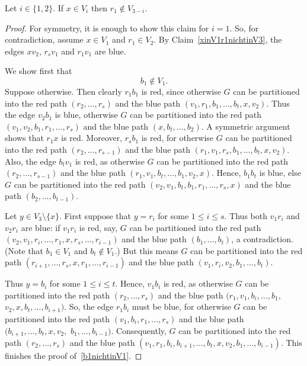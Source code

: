 \documentclass[a4paper,10pt]{article}
\begin{document}
\begin{claim}\label{xinV1r1inV2gehtnicht}
Let $i\in\{1,2\}$. If $x\in V_i$ then $r_1\notin V_{3-i}$.
\end{claim}

\begin{proof}
For symmetry, it is enough to show this claim for $i=1$. So, for contradiction, assume $x\in V_1$ and $r_1\in V_{2}$. 
By Claim~\ref{xinV1r1nichtinV3}, the edges $xv_{2}$, $r_sv_1$ and $r_1v_1$ are blue.

We show first that
\begin{equation}\label{b1nichtinV1}
 \text{$b_1 \notin V_1$.}
 \end{equation}
 Suppose otherwise.
Then clearly $r_1b_1$ is red, since otherwise $G$ can be partitioned into the red path $(r_2,\ldots,r_s)$ and the blue path $(v_1,r_1,b_1,\ldots,b_t,x,v_2)$.
Thus the edge $v_2b_1$ is blue, otherwise $G$ can be partitioned into the red path $(v_1,v_2,b_1,r_1,\ldots,r_s)$ and the blue path $(x,b_t,\ldots,b_2)$.
A symmetric argument shows that $r_1x$ is red.
Moreover, $r_sb_1$ is red, for otherwise $G$ can be partitioned into the red path $(r_2,\ldots,r_{s-1})$ and the blue path $(r_1,v_1,r_s,b_1,\ldots,b_t,x,v_2)$.
Also, the edge $b_tv_1$ is red, as otherwise $G$ can be partitioned into the red path $(r_2,\ldots,r_{s-1})$ and the blue path $(r_1,v_1,b_t,\ldots,b_1,v_2,x)$.
Hence, $b_1b_t$ is blue, else $G$ can be partitioned into the red path $(v_2,v_1,b_t,b_1,r_1,\ldots,r_s,x)$ and the blue path $(b_2,\ldots,b_{t-1})$.

Let $y \in V_3 \setminus \{x\}$.
First suppose that $y = r_i$ for some $1 \le i \le s$.
Thus both $v_1r_i$ and $v_2r_i$ are blue: if $v_1r_i$ is red, say, $G$ can be partitioned into the red path $(v_2,v_1,r_i,\ldots,r_1,x,r_s,\ldots,r_{i-1})$ and the blue path $(b_1,\ldots,b_t)$, a contradiction. (Note that $b_1\in V_1$ and $b_t\notin V_1$.)
But this means $G$ can be partitioned into the red path $(r_{i+1},\ldots,r_s,x,r_1,\ldots,r_{i-1})$ and the blue path $(v_1,r_i,v_2,b_1,\ldots,b_t)$.

Thus $y = b_i$ for some $1 \le i \le t$.
Hence, $v_1b_i$ is red, as otherwise $G$ can be partitioned into the red path $(r_2,\ldots,r_s)$ and the blue path $(r_1,v_1,b_i,\ldots,b_1,$ $v_2,x,b_t,\ldots,b_{i+1})$.
So, the edge $r_1b_i$ must be blue, for otherwise $G$ can be partitioned into the red path $(v_1,b_i,r_1,\ldots,r_s)$ and the blue path $(b_{i+1},\ldots,b_t,x,v_2,$ $b_1,\ldots,b_{i-1})$.
Consequently, $G$ can be partitioned into the red path $(r_2,\ldots,r_s)$ and the blue path $(v_1,r_1,b_i,b_{i+1},\ldots,b_t,x,v_2,b_1,\ldots,b_{i-1})$.
This finishes the proof of~\eqref{b1nichtinV1}.


\end{proof}
\end{document}
